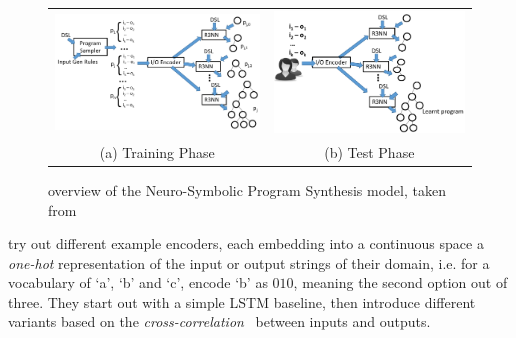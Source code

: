 \documentclass{article} %
\begin{document}
\begin{figure}[h]
    \begin{tabular}{c|c}
        \begin{minipage}{0.5\linewidth}
            \includegraphics[scale=0.3]{figures/nsps_training.pdf}
        \end{minipage}
        &
        \begin{minipage}{0.5\linewidth}
            \includegraphics[scale=0.3]{figures/nsps_test.pdf}
        \end{minipage}
        \\
        (a) Training Phase & (b) Test Phase
    \end{tabular}
    \caption{overview of the Neuro-Symbolic Program Synthesis model, taken from \citep{nsps}}
    \label{nsps}
\end{figure}

\citet{nsps} try out different example encoders,
each embedding into a continuous space a \emph{one-hot} representation of the input or output strings of their domain,
i.e. for a vocabulary of `a', `b' and `c', encode `b' as $010$,
meaning the second option out of three.
They start out with a simple LSTM baseline,
then introduce different variants based on the \emph{cross-correlation}~\citep{bracewell1986fourier} between inputs and outputs.
\end{document}
